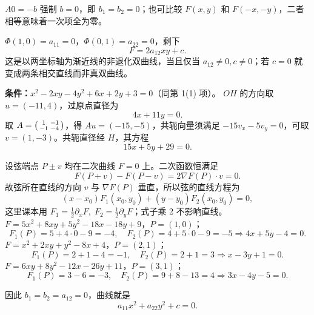 $A0=-b$ 强制 $b=0$，即 $b_1=b_2=0$；也可比较 $F(x,y)$ 和 $F(-x,-y)$，二者相等意味着一次项全为零。

$\Phi(1,0)=a_{11}=0$，$\Phi(0,1)=a_{22}=0$，剩下
\[F=2a_{12}xy+c.
\]
这是以两坐标轴为渐近线的非退化双曲线，当且仅当 $a_{12}\ne0,c\ne0$；若 $c=0$ 就变成两条相交直线而非真双曲线。

\textbf{条件：}$x^2-2xy-4y^2+6x+2y+3=0$（同第 1(1) 项）。
$OH$ 的方向取 $u=(-11,4)$，过原点直径为
\[\boxed{4x+11y=0.}
\]
取 $A=\begin{psmallmatrix}1&-1\\-1&-4\end{psmallmatrix}$，得 $Au=(-15,-5)$，共轭向量须满足 $-15v_x-5v_y=0$，可取 $v=(1,-3)$。共轭直径经 $H$，其方程
\[\boxed{15x+5y+29=0.}\]

 设弦端点 $P\pm v$ 均在二次曲线 $F=0$ 上。二次函数恒满足
\[F(P+v)-F(P-v)=2\nabla F(P)\cdot v=0.
\]
故弦所在直线的方向 $v$ 与 $\nabla F(P)$ 垂直，所以弦的直线方程为
\[\boxed{(x-x_0)F_1(x_0,y_0)+(y-y_0)F_2(x_0,y_0)=0},
\]
这里课本用 $F_1=\tfrac12\partial_xF,\;F_2=\tfrac12\partial_yF$；式子乘 2 不影响直线。
 $F=5x^2+8xy+5y^2-18x-18y+9$，$P=(1,0)$；
\[F_1(P)=5+4\cdot0-9=-4,\quad F_2(P)=4+5\cdot0-9=-5
\Rightarrow\boxed{4x+5y-4=0}.\]
 $F=x^2+2xy+y^2-8x+4$，$P=(2,1)$；
\[F_1(P)=2+1-4=-1,\quad F_2(P)=2+1=3
\Rightarrow\boxed{x-3y+1=0}.\]
 $F=6xy+8y^2-12x-26y+11$，$P=(3,1)$；
\[F_1(P)=3-6=-3,\quad F_2(P)=9+8-13=4
\Rightarrow\boxed{3x-4y-5=0}.\]

因此 $b_1=b_2=a_{12}=0$，曲线就是
\[\boxed{a_{11}x^2+a_{22}y^2+c=0}.\]

